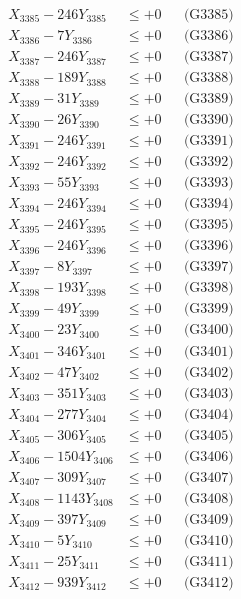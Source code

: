 \documentclass[a4paper,10pt]{article}
\begin{document}
{\begin{align}
X_{3385} - 246Y_{3385} &\leq +0 && \text{(G3385)} \\
X_{3386} - 7Y_{3386} &\leq +0 && \text{(G3386)} \\
X_{3387} - 246Y_{3387} &\leq +0 && \text{(G3387)} \\
X_{3388} - 189Y_{3388} &\leq +0 && \text{(G3388)} \\
X_{3389} - 31Y_{3389} &\leq +0 && \text{(G3389)} \\
X_{3390} - 26Y_{3390} &\leq +0 && \text{(G3390)} \\
\allowbreak
X_{3391} - 246Y_{3391} &\leq +0 && \text{(G3391)} \\
X_{3392} - 246Y_{3392} &\leq +0 && \text{(G3392)} \\
X_{3393} - 55Y_{3393} &\leq +0 && \text{(G3393)} \\
X_{3394} - 246Y_{3394} &\leq +0 && \text{(G3394)} \\
X_{3395} - 246Y_{3395} &\leq +0 && \text{(G3395)} \\
X_{3396} - 246Y_{3396} &\leq +0 && \text{(G3396)} \\
X_{3397} - 8Y_{3397} &\leq +0 && \text{(G3397)} \\
X_{3398} - 193Y_{3398} &\leq +0 && \text{(G3398)} \\
X_{3399} - 49Y_{3399} &\leq +0 && \text{(G3399)} \\
X_{3400} - 23Y_{3400} &\leq +0 && \text{(G3400)} \\
\allowbreak
X_{3401} - 346Y_{3401} &\leq +0 && \text{(G3401)} \\
X_{3402} - 47Y_{3402} &\leq +0 && \text{(G3402)} \\
X_{3403} - 351Y_{3403} &\leq +0 && \text{(G3403)} \\
X_{3404} - 277Y_{3404} &\leq +0 && \text{(G3404)} \\
X_{3405} - 306Y_{3405} &\leq +0 && \text{(G3405)} \\
X_{3406} - 1504Y_{3406} &\leq +0 && \text{(G3406)} \\
X_{3407} - 309Y_{3407} &\leq +0 && \text{(G3407)} \\
X_{3408} - 1143Y_{3408} &\leq +0 && \text{(G3408)} \\
X_{3409} - 397Y_{3409} &\leq +0 && \text{(G3409)} \\
X_{3410} - 5Y_{3410} &\leq +0 && \text{(G3410)} \\
\allowbreak
X_{3411} - 25Y_{3411} &\leq +0 && \text{(G3411)} \\
X_{3412} - 939Y_{3412} &\leq +0 && \text{(G3412)} \\

\end{align}}
\end{document}
